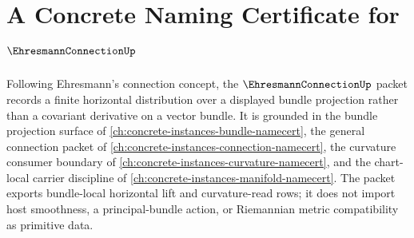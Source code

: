 \chapter{A Concrete Naming Certificate for $\EhresmannConnectionUp$}
\label{ch:concrete-instances-ehresmann-connection-namecert}

Following Ehresmann's connection concept, the $\EhresmannConnectionUp$ packet records a finite horizontal distribution over a displayed bundle projection rather than a covariant derivative on a vector bundle. It is grounded in the bundle projection surface of \autoref{ch:concrete-instances-bundle-namecert}, the general connection packet of \autoref{ch:concrete-instances-connection-namecert}, the curvature consumer boundary of \autoref{ch:concrete-instances-curvature-namecert}, and the chart-local carrier discipline of \autoref{ch:concrete-instances-manifold-namecert}. The packet exports bundle-local horizontal lift and curvature-read rows; it does not import host smoothness, a principal-bundle action, or Riemannian metric compatibility as primitive data.

